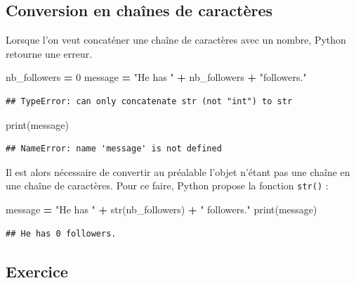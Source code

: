 \documentclass[
  12pt,
]{book}
\newenvironment{Shaded}{\begin{snugshade}}{\end{snugshade}}
\newcommand{\BuiltInTok}[1]{#1}
\newcommand{\DecValTok}[1]{\textcolor[rgb]{0.00,0.00,0.81}{#1}}
\newcommand{\NormalTok}[1]{#1}
\newcommand{\OperatorTok}[1]{\textcolor[rgb]{0.81,0.36,0.00}{\textbf{#1}}}
\newcommand{\StringTok}[1]{\textcolor[rgb]{0.31,0.60,0.02}{#1}}
\numberwithin{equation}{section}
\numberwithin{countremarque}{section}
\begin{document}
\subsection{Conversion en chaînes de caractères}\label{conversion-chaines-caracteres}

Lorsque l'on veut concaténer une chaîne de caractères avec un nombre, Python retourne une erreur.

\begin{Shaded}
\begin{Highlighting}[]
\NormalTok{nb\_followers }\OperatorTok{=} \DecValTok{0}
\NormalTok{message }\OperatorTok{=} \StringTok{"He has "} \OperatorTok{+}\NormalTok{ nb\_followers }\OperatorTok{+} \StringTok{"followers."}
\end{Highlighting}
\end{Shaded}

\begin{lstlisting}
## TypeError: can only concatenate str (not "int") to str
\end{lstlisting}

\begin{Shaded}
\begin{Highlighting}[]
\BuiltInTok{print}\NormalTok{(message)}
\end{Highlighting}
\end{Shaded}

\begin{lstlisting}
## NameError: name 'message' is not defined
\end{lstlisting}

Il est alors nécessaire de convertir au préalable l'objet n'étant pas une chaîne en une chaîne de caractères. Pour ce faire, Python propose la fonction \texttt{str()} :

\begin{Shaded}
\begin{Highlighting}[]
\NormalTok{message }\OperatorTok{=} \StringTok{"He has "} \OperatorTok{+} \BuiltInTok{str}\NormalTok{(nb\_followers) }\OperatorTok{+} \StringTok{" followers."}
\BuiltInTok{print}\NormalTok{(message)}
\end{Highlighting}
\end{Shaded}

\begin{lstlisting}
## He has 0 followers.
\end{lstlisting}

\subsection{Exercice}\label{exercice}
\end{document}
